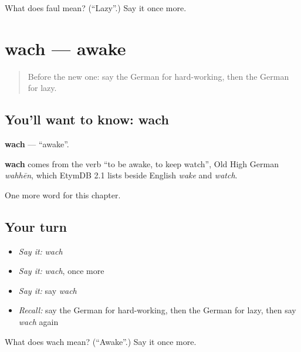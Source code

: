 \begin{tcolorbox}[breakable,colback=teal!4,colframe=teal!35!black,title={Before you move on}]
What does faul mean? (\textquotedblleft{}Lazy\textquotedblright{}.) Say it once more.
\end{tcolorbox}
\section[wach]{wach — awake}

\label{lesson:GE-C132-wach}



\begin{quote}
Before the new one: say the German for hard-working, then the German for lazy.
\end{quote}

\subsection*{You'll want to know: wach}
\textbf{wach} — \textquotedblleft{}awake\textquotedblright{}.

\begin{cousinweb}
\textbf{wach} comes from the verb \textquotedblleft{}to be awake, to keep watch\textquotedblright{}, Old High German \emph{wahhēn}, which EtymDB 2.1 lists beside English \emph{wake} and \emph{watch}.
\end{cousinweb}

\begin{grammarlens}[title={What you've built}]
One more word for this chapter.
\end{grammarlens}

\subsection*{Your turn}
\begin{itemize}
\raggedright
  \item \emph{Say it:} \emph{wach}
  \item \emph{Say it:} \emph{wach}, once more
  \item \emph{Say it:} say \emph{wach}
  \item \emph{Recall:} say the German for hard-working, then the German for lazy, then say \emph{wach} again
\end{itemize}

\begin{tcolorbox}[breakable,colback=teal!4,colframe=teal!35!black,title={Before you move on}]
What does wach mean? (\textquotedblleft{}Awake\textquotedblright{}.) Say it once more.
\end{tcolorbox}

